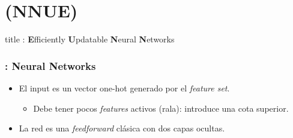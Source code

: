 
\section{ (NNUE)}

\begin{frame}
\vfill
\centering
\begin{beamercolorbox}[sep=8pt,center,shadow=false,rounded=false]{title}
    : \textbf{E}fficiently \textbf{U}pdatable \textbf{N}eural \textbf{N}etworks
    \par%
\end{beamercolorbox}
\vfill
\end{frame}



\begin{frame}
\frametitle{: \textbf{N}eural \textbf{N}etworks}
\begin{itemize}
\item El input es un vector one-hot generado por el \textit{feature set}.
\begin{itemize}
    \item Debe tener pocos \textit{features} activos (rala): introduce una cota superior.
\end{itemize}
\item La red es una \textit{feedforward} clásica con dos capas ocultas.
\end{itemize}
\end{frame}



